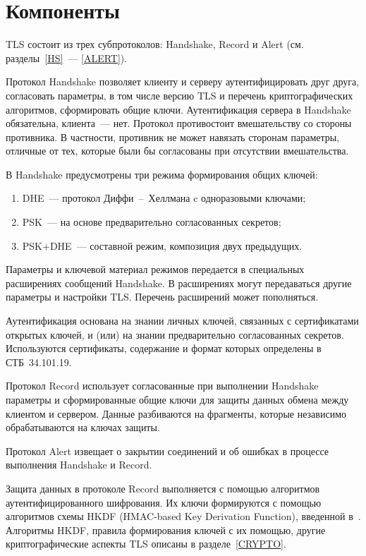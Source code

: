 \section{Компоненты}\label{COMMON.Components}

TLS состоит из трех субпротоколов: Handshake, Record и Alert 
(см. разделы~\ref{HS}~--- \ref{ALERT}). 

Протокол Handshake позволяет клиенту и серверу аутентифицировать друг 
друга, согласовать параметры, в том числе версию TLS и перечень 
криптографических алгоритмов, сформировать общие ключи.
%
Аутентификация сервера в Handshake обязательна, клиента~--- нет.
%
Протокол противостоит вмешательству со стороны противника.
%
В частности, противник не может навязать сторонам параметры, 
отличные от тех, которые были бы согласованы при отсутствии вмешательства.

В Handshake предусмотрены три режима формирования общих ключей:
\begin{enumerate}[label=\arabic*)]
\item
DHE~--- протокол Диффи~--~Хеллмана c одноразовыми ключами; 
\item
PSK~--- на основе предварительно согласованных секретов;
\item
PSK+DHE~--- составной режим, композиция двух предыдущих.
\end{enumerate}

Параметры и ключевой материал режимов передается в специальных расширениях 
сообщений Handshake. В расширениях могут передаваться другие параметры и 
настройки TLS. Перечень расширений может пополняться.

Аутентификация основана на знании личных ключей, связанных с сертификатами 
открытых ключей, и (или) на знании предварительно согласованных секретов.
%
Используются сертификаты, содержание и формат которых определены в 
СТБ~34.101.19.

Протокол Record использует согласованные при выполнении Handshake параметры и 
сформированные общие ключи для защиты данных обмена между клиентом и сервером.
%
Данные разбиваются на фрагменты, которые независимо обрабатываются на ключах 
защиты.

Протокол Alert извещает о закрытии соединений и об ошибках в процессе 
выполнения Handshake и Record.

Защита данных в протоколе Record выполняется с помощью алгоритмов
аутентифицированного шифрования. Их ключи формируются с помощью алгоритмов схемы
HKDF (HMAC-based Key Derivation Function), введенной в~\cite{Kra10,RFC5869}.
%
Алгоритмы HKDF, правила формирования ключей с их помощью, другие
криптографические аспекты TLS описаны в разделе~\ref{CRYPTO}.

